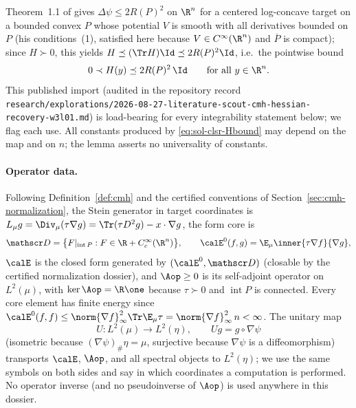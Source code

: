 \documentclass[../main.tex]{subfiles}
\begin{document}
\begin{remark}
\label{rem:sol-clsr-klartag-import}
Theorem~1.1 of \cite{Klartag2013MomentMeasures} gives $\Delta\psi\le2R(P)^2$ on $\R^n$ for a
centered log-concave target on a bounded convex $P$ whose potential $V$ is smooth with all
derivatives bounded on $P$ (his conditions~(1), satisfied here because $V\in C^\infty(\R^n)$
and $\overline P$ is compact); since $H\succ0$, this yields $H\preceq(\Tr H)\Id\preceq2R(P)^2\Id$,
i.e.\ the pointwise bound
\begin{equation}
  0\prec H(y)\preceq 2R(P)^2\,\Id\qquad\text{for all }y\in\R^n.
  \label{eq:sol-clsr-Hbound}
\end{equation}
This published import (audited in the repository record
\texttt{research/explorations/2026-08-27-literature-scout-cmh-hessian-recovery-w3l01.md}) is
load-bearing for every integrability statement below; we flag each use.  All constants produced
by \eqref{eq:sol-clsr-Hbound} may depend on the map and on $n$; the lemma asserts no
universality of constants.
\end{remark}

\paragraph{Operator data.}
Following Definition~\ref{def:cmh} and the certified conventions of
Section~\ref{sec:cmh-normalization}, the Stein generator in target coordinates is
$L_\mu g=\Div_\mu(\tau\nabla g)=\Tr(\tau D^2g)-x\cdot\nabla g$, the form core is
\[
  \mathscr D=\bigl\{F|_{\operatorname{int}P}:F\in\R+C_c^\infty(\R^n)\bigr\},
  \qquad
  \calE^0(f,g)=\E_\mu\inner{\tau\nabla f}{\nabla g},
\]
$\calE$ is the closed form generated by $(\calE^0,\mathscr D)$ (closable by the certified
normalization dossier), and $\Aop\ge0$ is its self-adjoint operator on $L^2(\mu)$, with
$\ker\Aop=\R\one$ because $\tau\succ0$ and $\operatorname{int}P$ is connected.  Every core
element has finite energy since $\calE^0(f,f)\le\norm{\nabla f}_\infty^2\Tr\E_\mu\tau
=\norm{\nabla f}_\infty^2\,n<\infty$.  The unitary map
\[
  U:L^2(\mu)\to L^2(\eta),\qquad Ug=g\circ\nabla\psi
\]
(isometric because $(\nabla\psi)_\#\eta=\mu$, surjective because $\nabla\psi$ is a
diffeomorphism) transports $\calE$, $\Aop$, and all spectral objects to $L^2(\eta)$; we use the
same symbols on both sides and say in which coordinates a computation is performed.  No
operator inverse (and no pseudoinverse of $\Aop$) is used anywhere in this dossier.
\end{document}
